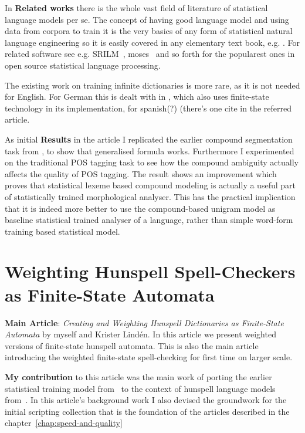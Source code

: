 \documentclass[officiallayout,draft]{unihelcompling}
\begin{document}
In \textbf{Related works} there is the whole vast field of literature of
statistical language models per se. The concept of having good language model
and using data from corpora to train it is the very basics of any form of
statistical natural language engineering so it is easily covered in any
elementary text book, e.g. \cite{noppakirja}. For related software see e.g.
SRILM~\cite{srilm}, moses~\cite{moses} and so forth for the popularest ones
in open source statistical language processing.

The existing work on training infinite dictionaries is more rare, as it is not
needed for English. For German this is dealt with in \cite{schiller}, which
also uses finite-state technology in its implementation, for spanish(?)
(there's one cite in the referred article.

As initial \textbf{Results} in the article I replicated the earlier compound
segmentation task from \cite{}, to show that generalised formula works.
Furthermore I experimented on the traditional POS tagging task to see how the
compound ambiguity actually affects the quality of POS tagging. The result
shows an improvement which proves that statistical lexeme based compound
modeling is actually a useful part of statistically trained morphological
analyser. This has the practical implication that it is indeed more better to
use the compound-based unigram model as baseline statistical trained analyser
of a language, rather than simple word-form training based statistical model.

\section{Weighting Hunspell Spell-Checkers as Finite-State Automata}

\textbf{Main Article}: \emph{Creating and Weighting Hunspell Dictionaries as Finite-State Automata} by myself and Krister Lindén. In this article we present
weighted versions of finite-state hunspell automata. This is also the main
article introducing the weighted finite-state spell-checking for first time
on larger scale.

\textbf{My contribution} to this article was the main work of porting the
earlier statistical training model from~\cite{} to the context of hunspell
language models from~\cite{}. In this article's background work I also devised
the groundwork for the initial scripting collection that is the foundation
of the articles described in the chapter~\ref{chap:speed-and-quality}
\end{document}
